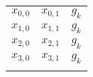 \begin{table}
    \centering
    \begin{tabular}{ccc}
        \(x_{0,0}\) \color{blue}{0} & \(x_{0,1}\) \color{blue}{0} & \(g_k\) \color{green}{0} \\
        \(x_{1,0}\) \color{blue}{0} & \(x_{1,1}\) \color{red}{1} & \(g_k\) \color{green}{0} \\
        \(x_{2,0}\) \color{red}{1} & \(x_{2,1}\) \color{blue}{0} & \(g_k\) \color{green}{0} \\
        \(x_{3,0}\) \color{red}{1} & \(x_{3,1}\) \color{red}{1} & \(g_k\) \color{green}{1} \\
            &  & \\
    \end{tabular}
\end{table}